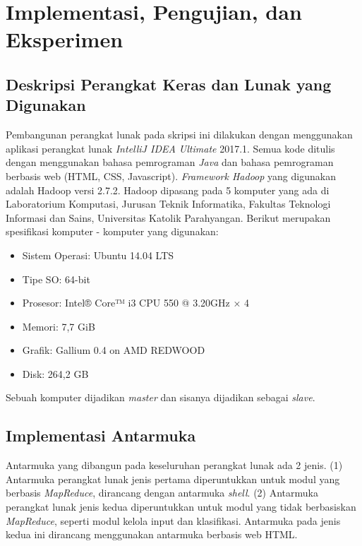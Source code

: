 \chapter{Implementasi, Pengujian, dan Eksperimen}
\label{chap:Implementasi, Pengujian, dan Eksperimen}

\section{Deskripsi Perangkat Keras dan Lunak yang Digunakan}
\label{sec:desc_perangkat}
Pembangunan perangkat lunak pada skripsi ini dilakukan dengan menggunakan aplikasi perangkat lunak \textit{IntelliJ IDEA Ultimate} 2017.1. Semua kode ditulis dengan menggunakan bahasa pemrograman \textit{Java} dan bahasa pemrograman berbasis web (HTML, CSS, Javascript). \textit{Framework Hadoop} yang digunakan adalah Hadoop versi 2.7.2. Hadoop dipasang pada 5 komputer yang ada di Laboratorium Komputasi, Jurusan Teknik Informatika, Fakultas Teknologi Informasi dan Sains, Universitas Katolik Parahyangan. Berikut merupakan spesifikasi komputer - komputer yang digunakan:
\begin{itemize}
	\item Sistem Operasi: Ubuntu 14.04 LTS
	\item Tipe SO: 64-bit
	\item Prosesor: Intel® Core™ i3 CPU 550 @ 3.20GHz × 4 
	\item Memori: 7,7 GiB
	\item Grafik: Gallium 0.4 on AMD REDWOOD
	\item Disk: 264,2 GB
\end{itemize}
Sebuah komputer dijadikan \textit{master} dan sisanya dijadikan sebagai \textit{slave}.

\section{Implementasi Antarmuka}
\label{sec:impl_antarmuka}

Antarmuka yang dibangun pada keseluruhan perangkat lunak ada 2 jenis. (1) Antarmuka perangkat lunak jenis pertama diperuntukkan untuk modul yang berbasis \textit{MapReduce}, dirancang dengan antarmuka \textit{shell}. (2) Antarmuka perangkat lunak jenis kedua diperuntukkan untuk modul yang tidak berbasiskan \textit{MapReduce}, seperti modul kelola input dan klasifikasi. Antarmuka pada jenis kedua ini dirancang menggunakan antarmuka berbasis web HTML.

